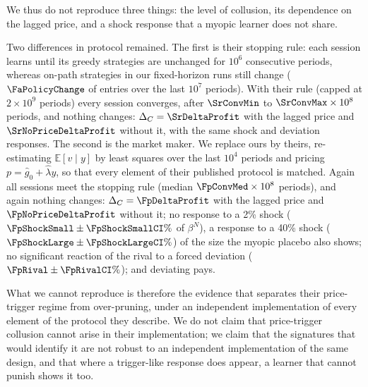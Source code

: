 We thus do not reproduce three things: the level of collusion, its
dependence on the lagged price, and a shock response that a myopic learner
does not share.

Two differences in protocol remained. The first is their stopping rule:
each session learns until its greedy strategies are unchanged for $10^6$
consecutive periods, whereas on-path strategies in our fixed-horizon runs
still change ($\FaPolicyChange$ of entries over the last $10^7$ periods). With
their rule (capped at $2\times10^9$ periods) every session converges, after
$\SrConvMin$ to $\SrConvMax\times10^8$ periods, and nothing changes:
$\Delta_C=\SrDeltaProfit$ with the lagged price and $\SrNoPriceDeltaProfit$
without it, with the same shock and deviation responses.
The second is the market maker. We replace ours by theirs, re-estimating
$\mathbb E[v\mid y]$ by least squares over the last $10^4$ periods and pricing
$p=\hat g_0+\hat\lambda y$, so that every element of their published protocol
is matched. Again all sessions meet the stopping rule (median
$\FpConvMed\times10^8$ periods), and again nothing changes: $\Delta_C=\FpDeltaProfit$
with the lagged price and $\FpNoPriceDeltaProfit$ without it; no response to a
2\% shock ($\FpShockSmall\pm\FpShockSmallCI\%$ of $\beta^N$), a response to a
40\% shock ($\FpShockLarge\pm\FpShockLargeCI\%$) of the size the myopic placebo
also shows; no significant reaction of the rival to a forced deviation
($\FpRival\pm\FpRivalCI\%$); and deviating pays.

What we cannot reproduce is therefore the evidence that separates their
price-trigger regime from over-pruning, under an independent implementation
of every element of the protocol they describe. We do not claim that
price-trigger collusion cannot arise in their implementation; we claim that
the signatures that would identify it are not robust to an independent
implementation of the same design, and that where a trigger-like response
does appear, a learner that cannot punish shows it too.
